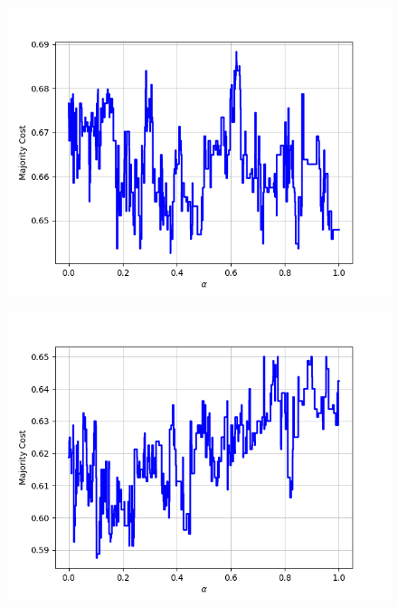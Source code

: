 \begin{figure}[H]
\begin{minipage}{.24\textwidth}
  {\includegraphics[width=\linewidth]{plots/omniglot-intra-ac-cnn/Japanese_(hiragana)}}
\end{minipage}
\begin{minipage}{.24\textwidth}
  \centering
  {\includegraphics[width=\linewidth]{plots/omniglot-intra-ac-cnn/Japanese_(katakana)}}
\end{minipage}
\begin{minipage}{.24\textwidth}
  \centering

\end{minipage}
\end{figure}
